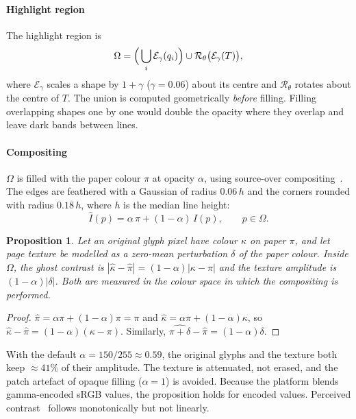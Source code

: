 \documentclass[journal]{IEEEtran}
\newtheorem{proposition}{Proposition}
\theoremstyle{definition}
\begin{document}
\paragraph{Highlight region}
The highlight region is
\begin{equation}
  \Omega=\Bigl(\,\bigcup_i \mathcal{E}_{\gamma}(q_i)\Bigr)\cup
         \mathcal{R}_{\theta}\bigl(\mathcal{E}_{\gamma}(T)\bigr),
\end{equation}
where $\mathcal{E}_\gamma$ scales a shape by $1+\gamma$ ($\gamma=0.06$) about
its centre and $\mathcal{R}_\theta$ rotates about the centre of $T$. The union
is computed geometrically \emph{before} filling. Filling overlapping shapes one
by one would double the opacity where they overlap and leave dark bands
between lines.

\paragraph{Compositing}
$\Omega$ is filled with the paper colour $\pi$ at opacity $\alpha$, using
source-over compositing~\cite{porter1984compositing}. The edges are feathered
with a Gaussian of radius $0.06\,h$ and the corners rounded with radius
$0.18\,h$, where $h$ is the median line height:
\begin{equation}
  \hat I(p)=\alpha\,\pi+(1-\alpha)\,I(p),\qquad p\in\Omega .
\end{equation}

\begin{proposition}\label{prop:contrast}
Let an original glyph pixel have colour $\kappa$ on paper $\pi$, and let page
texture be modelled as a zero-mean perturbation $\delta$ of the paper colour.
Inside $\Omega$, the ghost contrast is
$|\hat\kappa-\hat\pi|=(1-\alpha)|\kappa-\pi|$ and the texture amplitude is
$(1-\alpha)|\delta|$. Both are measured in the colour space in which the
compositing is performed.
\end{proposition}
\begin{proof}
$\hat\pi=\alpha\pi+(1-\alpha)\pi=\pi$ and
$\hat\kappa=\alpha\pi+(1-\alpha)\kappa$, so
$\hat\kappa-\hat\pi=(1-\alpha)(\kappa-\pi)$. Similarly,
$\widehat{\pi+\delta}-\hat\pi=(1-\alpha)\delta$.
\end{proof}
With the default $\alpha=150/255\approx0.59$, the original glyphs and the
texture both keep $\approx41\%$ of their amplitude. The texture is attenuated,
not erased, and the patch artefact of opaque filling ($\alpha=1$) is avoided.
Because the platform blends gamma-encoded sRGB values, the proposition holds
for encoded values. Perceived contrast~\cite{wcag21} follows monotonically but
not linearly.
\end{document}

